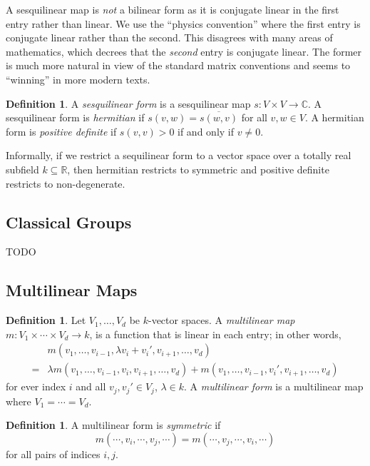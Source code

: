 \documentclass[12pt]{article}
\theoremstyle{plain}
\theoremstyle{definition}
\newtheorem{definition}[theorem]{Definition}
\theoremstyle{remark}
\numberwithin{equation}{section}
\begin{document}
A sesquilinear map is \emph{not} a bilinear form as it is conjugate
linear in the first entry rather than linear.
We use the ``physics convention'' where the first entry is conjugate
linear rather than the second.  This disagrees with many areas of
mathematics, which decrees that the \emph{second} entry is conjugate linear.
The former is much more natural in view of the standard matrix
conventions and seems to ``winning'' in more modern texts.

\begin{definition}
A \emph{sesquilinear form} is a sesquilinear map $s: V \times V \to
\mathbb{C}$.
A sesquilinear form is \emph{hermitian} if $s(v,w)=\overline{s(w,v)}$
for all $v,w \in V$.
A hermitian form is \emph{positive definite} if $s(v,v) > 0$ if and only
if $v \ne 0$.
\end{definition}

Informally, if we restrict a sequilinear form to a vector space over a totally real
subfield $k \subseteq \mathbb{R}$, then hermitian restricts to symmetric
and positive definite restricts to non-degenerate.

\subsection{Classical Groups}

TODO

\subsection{Multilinear Maps}

\begin{definition}
Let $V_1,\ldots, V_d$ be $k$-vector spaces.
A \emph{multilinear map} $m: V_1 \times \cdots \times V_d \to k$,
is a function that is linear in each entry; in other words,
\begin{align*}
&m(v_1,\ldots,v_{i-1},\lambda v_i + v_i',v_{i+1},\ldots,v_d)\\
=& \lambda m(v_1,\ldots,v_{i-1},v_i,v_{i+1},\ldots,v_d)
+ m(v_1,\ldots,v_{i-1},v_i',v_{i+1},\ldots,v_d)
\end{align*}
for ever index $i$ and all $v_j,v_j' \in V_j$, $\lambda \in k$.
A \emph{multilinear form} is a multilinear map where $V_1 = \cdots = V_d$.
\end{definition}

\begin{definition}
A multilinear form is
\emph{symmetric} if
\[
m(\cdots,v_i,\cdots,v_j,\cdots) = m(\cdots,v_j,\cdots,v_i,\cdots)
\]
for all pairs of indices $i,j$.
\end{definition}
\end{document}
